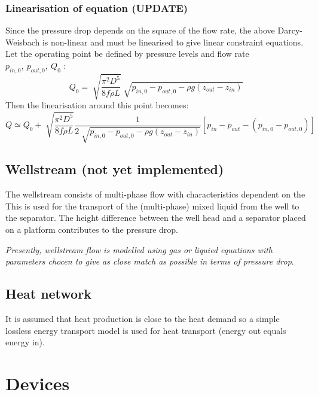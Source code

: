 \documentclass[12pt]{article}
\begin{document}
\subsubsection{Linearisation of equation (UPDATE)}
Since the pressure drop depends on the square of the flow rate, the above Darcy-Weisbach is non-linear and must be linearised to give linear constraint equations. Let the operating point be defined by pressure levels and flow rate  \( p_{in,0},~p_{out,0},~Q_{0} \) :
\begin{equation}
	 Q_{0}=\sqrt[]{\frac{ \pi ^{2}D^{5}}{8f \rho L}}\sqrt[]{p_{in,0}-p_{out,0}- \rho g \left( z_{out}-z_{in} \right) } 
\end{equation}
Then the linearisation around this point becomes:
\begin{equation}
	 Q\simeq Q_{0}+\sqrt[]{\frac{ \pi ^{2}D^{5}}{8f \rho L}}\frac{1}{2\sqrt[]{p_{in,0}-p_{out,0}- \rho g \left( z_{out}-z_{in} \right) }} \left[ p_{in}-p_{out}- \left( p_{in,0}-p_{out,0} \right)  \right]  
\end{equation} 





\subsection{Wellstream (not yet implemented)}
The wellstream consists of multi-phase flow with characteristics dependent on the
This is used for the transport of the (multi-phase) mixed liquid from the well to the separator. The height difference between the well head and a separator placed on a platform contributes to the pressure drop. 

\medskip\noindent
\textit{Presently, wellstream flow is modelled using gas or liquied equations with parameters chocen to give as close match as possible in terms of pressure drop}.



\subsection{Heat network}
It is assumed that heat production is close to the heat demand so a simple lossless energy transport model is used for heat transport (energy out equals energy in).






\section{Devices}
\label{sec:devices}
\end{document}
